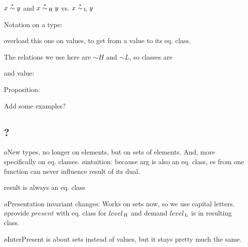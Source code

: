 $x \stackrel{*}{\sim} y$ and $x \stackrel{*}{\sim}_{\, \mathrm H} y$  vs.  $x \stackrel{*}{\sim}_{\, \mathrm L} y$ 

Notation on a type:


overload this one on values, to get from a value to its eq. class. 



The relations we use here are $\sim H$ and $\sim L$, so classes are 


and value:


Proposition:


Add some examples?


\subsection{?}

\bl
\o New types, no longer on elements, but on sets of elements. And, more specifically on eq. classes.
\o intuition: because arg is also an eq. class, es from one function can never influence result of its dual.
\el


result is always an eq. class


\bl
\o Presentation invariant changes: Works on sets now, so we use capital letters.
\o provide $present$ with eq. class for $level_{\, \mathrm H}$ and demand $level_{\, \mathrm L}$ is in resulting class.
\el



\bl
\o {\sc InterPresent} is about sets instead of values, but it stays pretty much the same.
\el

